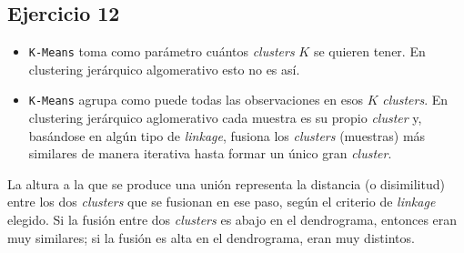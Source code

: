 \documentclass[a4paper,12pt]{article}
\begin{document}
\subsection*{Ejercicio 12}
\begin{itemize}
	\item \texttt{K-Means} toma como parámetro cuántos \textit{clusters} $K$ se quieren tener. En clustering jerárquico algomerativo esto no es así.
	\item \texttt{K-Means} agrupa como puede todas las observaciones en esos $ K $ \textit{clusters}. En clustering jerárquico aglomerativo cada muestra es su propio \textit{cluster} y, basándose en algún tipo de \textit{linkage}, fusiona los \textit{clusters} (muestras) más similares de manera iterativa hasta formar un único gran \textit{cluster}.
\end{itemize}
\noindent La altura a la que se produce una unión representa la distancia (o disimilitud) entre los dos \textit{clusters} que se fusionan en ese paso, según el criterio de \textit{linkage} elegido. Si la fusión entre dos \textit{clusters} es abajo en el dendrograma, entonces eran muy similares; si la fusión es alta en el dendrograma, eran muy distintos.
\end{document}
